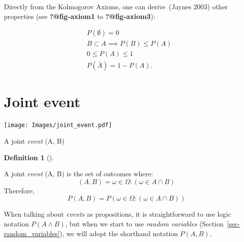 \documentclass[
  letterpaper,
  12pt,
  british]{tufte-book}
\theoremstyle{plain}
\theoremstyle{plain}
\theoremstyle{definition}
\newtheorem{definition}{Definition}[chapter]
\theoremstyle{remark}
\begin{document}

Directly from the Kolmogorov Axioms, one can derive~(Jaynes
2003)
other properties (see \textbf{?@fig-axiom1} to \textbf{?@fig-axiom3}):

\begin{align}
&P(\emptyset)=0\\
&B \subset A \implies P(B) \leq P(A)\\
&0 \leq P(A) \leq 1\\
&P(\bar{A})=1-P(A).
\end{align}

\hypertarget{joint-event}{%
\section{Joint event}\label{joint-event}}

\begin{marginfigure}

{\centering \texttt{[image: Images/joint\_event.pdf]}

}

\caption{\label{fig-joint_event}A joint \emph{event} (A, B)}

\end{marginfigure}

\leavevmode{}%
\begin{definition}[]\label{def-joint_event}

A joint \emph{event} (A, B) is the set of outcomes where:
\[(A, B) = {\omega \in \Omega: (\omega \in A \cap B) }\] Therefore,
\[P(A, B) =P({\omega \in \Omega: (\omega \in A \cap B) })\]

\end{definition}

When talking about \emph{events} as propositions, it is straightforward
to use logic notation \(P(A \land B)\), but when we start to use
\emph{random variables} (Section~\ref{sec-random_variables}), we will
adopt the shorthand notation \(P(\mathit{A}, \mathit{B}).\)
\end{document}
